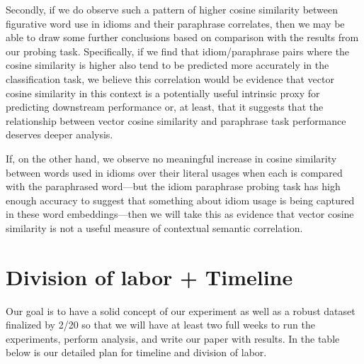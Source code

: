 \documentclass[11pt,a4paper]{article}
\begin{document}
Secondly, if we do observe such a pattern of higher cosine similarity between figurative word use in idioms and their paraphrase correlates, then we may be able to draw some further conclusions based on comparison with the results from our probing task. Specifically, if we find that idiom/paraphrase pairs where the cosine similarity is higher also tend to be predicted more accurately in the classification task, we believe this correlation would be evidence that vector cosine similarity in this context is a potentially useful intrinsic proxy for predicting downstream performance or, at least, that it suggests that the relationship between vector cosine similarity and paraphrase task performance deserves deeper analysis. 

If, on the other hand, we observe no meaningful increase in cosine similarity between words used in idioms over their literal usages when each is compared with the paraphrased word---but the idiom paraphrase probing task has high enough accuracy to suggest that something about idiom usage is being captured in these word embeddings---then we will take this as evidence that vector cosine similarity is not a useful measure of contextual semantic correlation.


\vspace{15mm}





\section{Division of labor + Timeline}
Our goal is to have a solid concept of our experiment as well as a robust dataset finalized by 2/20 so that we will have at least two full weeks to run the experiments, perform analysis, and write our paper with results. In the table below is our detailed plan for timeline and division of labor.

\clearpage
\end{document}
